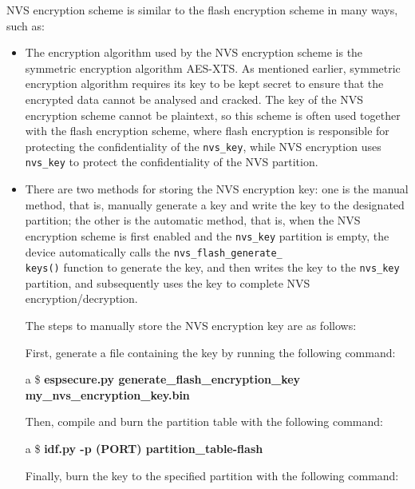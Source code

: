 \documentclass[a4paper,12pt]{book}
\begin{document}
NVS encryption scheme is similar to the flash encryption scheme in many ways, such as:

\begin{itemize}[leftmargin=1em]
    \item The encryption algorithm used by the NVS encryption scheme is the symmetric encryption algorithm AES-XTS. As mentioned earlier, symmetric encryption algorithm requires its key to be kept secret to ensure that the encrypted data cannot be analysed and cracked. The key of the NVS encryption scheme cannot be plaintext, so this scheme is often used together with the flash encryption scheme, where flash encryption is responsible for protecting the confidentiality of the \verb|nvs_key|, while NVS encryption uses \verb|nvs_key| to protect the confidentiality of the NVS partition.
    \item There are two methods for storing the NVS encryption key: one is the manual method, that is, manually generate a key and write the key to the designated partition; the other is the automatic method, that is, when the NVS encryption scheme is first enabled and the \verb|nvs_key| partition is empty, the device automatically calls the \verb|nvs_flash_generate_|\\ \verb|keys()| function to generate the key, and then writes the key to the \verb|nvs_key| partition, and subsequently uses the key to complete NVS encryption/decryption.

    The steps to manually store the NVS encryption key are as follows:

    First, generate a file containing the key by running the following command:
    
    \begin{codebloc}
    \begin{tabular}{a}
    \$ \textbf{espsecure.py generate\_flash\_encryption\_key my\_nvs\_encryption\_key.bin}
    \end{tabular}
    \end{codebloc}
    
    Then, compile and burn the partition table with the following command:
    
    \begin{codebloc}
    \begin{tabular}{a}
    \$ \textbf{idf.py -p (PORT) partition\_table-flash}
    \end{tabular}
    \end{codebloc}
    
    Finally, burn the key to the specified partition with the following command:
    

\end{itemize}
\end{document}
